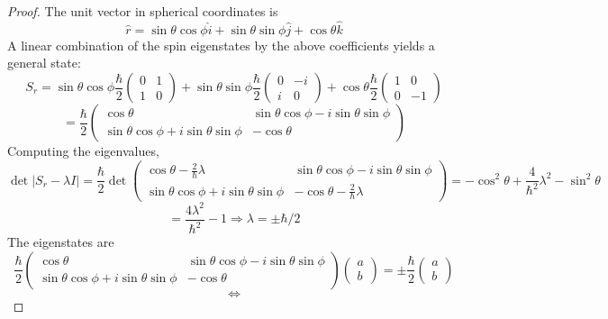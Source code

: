 \documentclass{article}
\begin{document}
\begin{proof}
  The unit vector in spherical coordinates is
  \[
    \hat{r} = \sin\theta\cos\phi\hat{i} + \sin\theta\sin\phi\hat{j} + \cos\theta\hat{k}
  \]
  A linear combination of the spin eigenstates by the above coefficients yields a general state:
  \[
    S_{r} = \sin\theta\cos\phi\frac{\hbar}{2}
    \begin{pmatrix}
      0 & 1 \\
      1 & 0
    \end{pmatrix}
    + \sin\theta\sin\phi\frac{\hbar}{2}
    \begin{pmatrix}
      0 & -i \\
      i & 0
    \end{pmatrix}
    + \cos\theta\frac{\hbar}{2}
    \begin{pmatrix}
      1 & 0 \\
      0 & -1
    \end{pmatrix}
  \]
  \[
    = \frac{\hbar}{2}
    \begin{pmatrix}
      \cos\theta & \sin\theta\cos\phi - i\sin\theta\sin\phi \\
      \sin\theta\cos\phi + i\sin\theta\sin\phi & -\cos\theta
    \end{pmatrix}
  \]
  Computing the eigenvalues,
  \[
    \det|S_{r}-\lambda I| = \frac{\hbar}{2}\det
    \begin{pmatrix}
      \cos\theta - \frac{2}{\hbar}\lambda & \sin\theta\cos\phi - i\sin\theta\sin\phi \\
      \sin\theta\cos\phi + i\sin\theta\sin\phi & -\cos\theta-\frac{2}{\hbar}\lambda
    \end{pmatrix}
    = -\cos^{2}\theta + \frac{4}{\hbar^{2}}\lambda^{2}
    - \sin^{2}\theta
  \]
  \[
    = \frac{4\lambda^{2}}{\hbar^{2}} - 1
    \Rightarrow \lambda = \pm \hbar/2
  \]
  The eigenstates are
  \[
    \frac{\hbar}{2}
    \begin{pmatrix}
      \cos\theta & \sin\theta\cos\phi - i\sin\theta\sin\phi \\
      \sin\theta\cos\phi + i\sin\theta\sin\phi & -\cos\theta
    \end{pmatrix}
    \begin{pmatrix}
      a \\
      b
    \end{pmatrix}
    = \pm\frac{\hbar}{2}
    \begin{pmatrix}
      a \\
      b
    \end{pmatrix}
  \]
  \[
    \Leftrightarrow
\]
\end{proof}
\end{document}
